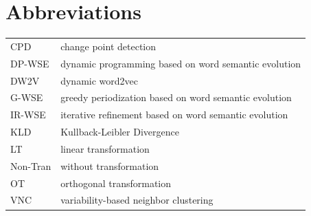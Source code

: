 \documentclass[output=paper]{langsci/langscibook}
\begin{document}
\section*{Abbreviations}
\begin{tabularx}{\textwidth}{@{}lQ@{}}
CPD&       change point detection \\
DP-WSE&    dynamic programming based on word semantic evolution \\
DW2V&      dynamic word2vec \\
G-WSE&     greedy periodization based on word semantic evolution \\
IR-WSE&    iterative refinement based on word semantic evolution \\
KLD&       Kullback-Leibler Divergence \\
LT &       linear transformation \\
Non-Tran & without transformation  \\
OT&        orthogonal transformation \\
VNC&       variability-based neighbor clustering
\end{tabularx}

{\sloppy\printbibliography[heading=subbibliography,notkeyword=this]}
\end{document}
